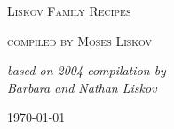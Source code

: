 \begin{titlepage}

\begin{center}

\vskip 5cm

\HRule

\vskip 0.5cm

\textsc{\LARGE Liskov Family Recipes}

\vskip 0.2cm

\HRule

\vskip 0.5cm

\textsc{\Large compiled by Moses Liskov\\}

\vskip 0.2cm

\textit{based on 2004 compilation by\\ Barbara and Nathan Liskov}

\vfill
{\Large \today}
\end{center}
\end{titlepage}